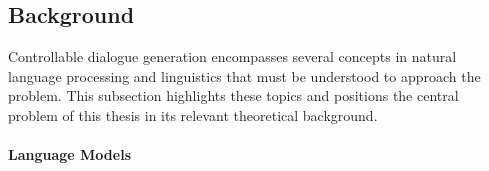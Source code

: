 \subsection{Background}



Controllable dialogue generation encompasses several concepts in natural language processing and linguistics that must be understood to approach the problem. This subsection highlights these topics and positions the central problem of this thesis in its relevant theoretical background.

\paragraph{Language Models}

